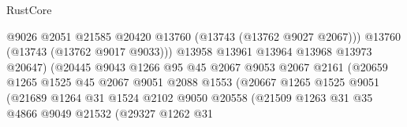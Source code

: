 \begin{lexlean}{RustCore}
\begin{coremodule}
                                            @9026
                                            @2051
                                            @21585
                                            @20420
                                            @13760
                                            (@13743 (@13762 @9027 @2067)))
                                          @13760
                                          (@13743 (@13762 @9017 @9033)))
                                        @13958
                                        @13961
                                        @13964
                                        @13968
                                        @13973
                                        @20647)
                                      (@20445
                                        @9043
                                        @1266
                                        @95
                                        @45
                                        @2067
                                        @9053
                                        @2067
                                        @2161
                                        (@20659
                                          @1265
                                          @1525
                                          @45
                                          @2067
                                          @9051
                                          @2088
                                          @1553
                                          (@20667
                                            @1265
                                            @1525
                                            @9051
                                            (@21689
                                              @1264
                                              @31
                                              @1524
                                              @2102
                                              @9050
                                              @20558
                                              (@21509
                                                @1263
                                                @31
                                                @35
                                                @4866
                                                @9049
                                                @21532
                                                (@29327
                                                  @1262
                                                  @31

\end{coremodule}
\end{lexlean}
